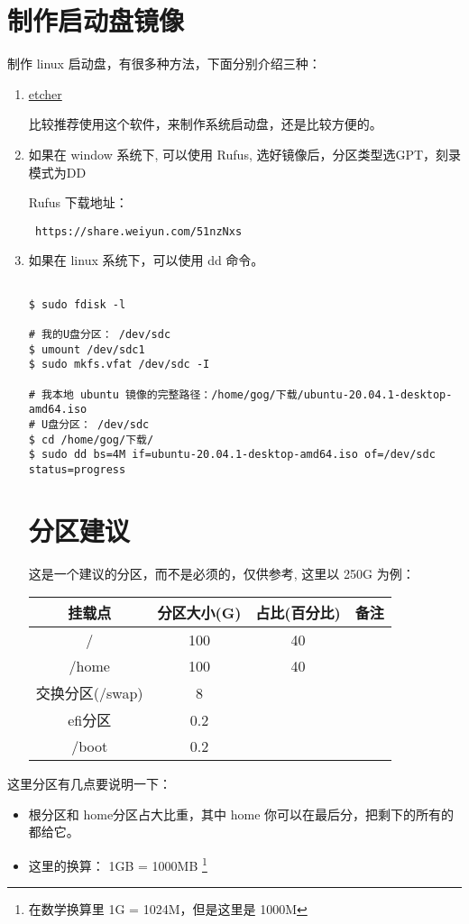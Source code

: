 \section{制作启动盘镜像}
制作 linux 启动盘，有很多种方法，下面分别介绍三种：
\flushleft
\begin{enumerate}

\item \href{https://www.balena.io/etcher/}{etcher}

比较推荐使用这个软件，来制作系统启动盘，还是比较方便的。

\item 如果在 window 系统下, 可以使用 Rufus, 选好镜像后，分区类型选GPT，刻录模式为DD

Rufus 下载地址：\\
\begin{lstlisting}
 https://share.weiyun.com/51nzNxs
\end{lstlisting}
\item 如果在 linux 系统下，可以使用 dd 命令。
\begin{lstlisting}

$ sudo fdisk -l 

# 我的U盘分区： /dev/sdc
$ umount /dev/sdc1
$ sudo mkfs.vfat /dev/sdc -I

# 我本地 ubuntu 镜像的完整路径：/home/gog/下载/ubuntu-20.04.1-desktop-amd64.iso 
# U盘分区： /dev/sdc
$ cd /home/gog/下载/
$ sudo dd bs=4M if=ubuntu-20.04.1-desktop-amd64.iso of=/dev/sdc status=progress
\end{lstlisting}

\section{分区建议}
这是一个建议的分区，而不是必须的，仅供参考, 这里以 250G 为例：


\begin{tabular}{|c|c|c|p{1.5cm}|}
\hline
 挂载点 & 分区大小(G) & 占比(百分比) & 备注\\
\hline
   / & 100 & 40 &\\      
\hline
   /home & 100 & 40 &\\      
\hline
  交换分区(/swap) & 8 & &\\
\hline
  efi分区 & 0.2 & &\\
\hline
  /boot & 0.2 & &\\
\hline
\end{tabular}

\end{enumerate}

\setlength\parindent{2em}这里分区有几点要说明一下：

\begin{itemize}
\item 根分区和 home分区占大比重，其中 home 你可以在最后分，把剩下的所有的都给它。
\item 这里的换算： 1GB = 1000MB \footnote{在数学换算里 1G = 1024M，但是这里是 1000M}
\end{itemize}
